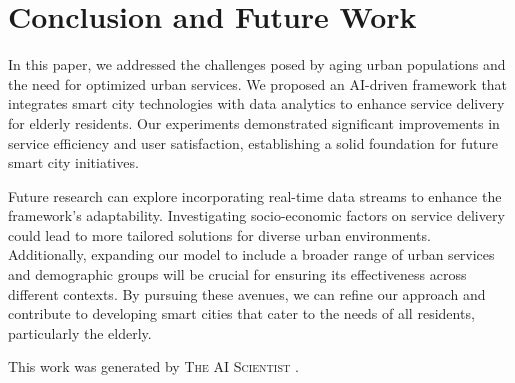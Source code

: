 \documentclass{article} %
\begin{document}
\section{Conclusion and Future Work}
\label{sec:conclusion}
In this paper, we addressed the challenges posed by aging urban populations and the need for optimized urban services. We proposed an AI-driven framework that integrates smart city technologies with data analytics to enhance service delivery for elderly residents. Our experiments demonstrated significant improvements in service efficiency and user satisfaction, establishing a solid foundation for future smart city initiatives.

Future research can explore incorporating real-time data streams to enhance the framework's adaptability. Investigating socio-economic factors on service delivery could lead to more tailored solutions for diverse urban environments. Additionally, expanding our model to include a broader range of urban services and demographic groups will be crucial for ensuring its effectiveness across different contexts. By pursuing these avenues, we can refine our approach and contribute to developing smart cities that cater to the needs of all residents, particularly the elderly.

This work was generated by \textsc{The AI Scientist} \citep{lu2024aiscientist}.



\end{document}
